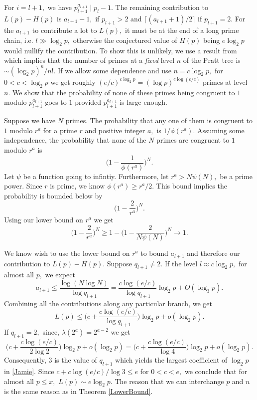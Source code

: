 \documentclass[12pt,regno]{amsart}
\begin{document}
For $i=l+1,$ we have $p_{l+1}^{a_{l+1}} \mid p_l-1.$ The remaining contribution to $L(p)-H(p)$ is $a_{l+1}-1,$ if $p_{l+1}>2$ and $\lceil (a_{l+1}+1)/2\rceil$ if $p_{l+1}=2.$ For the $a_{l+1}$ to contribute a lot to $L(p),$ it must be at the end of a long prime chain, i.e. $l \gg \log_2 p,$ otherwise the conjectured value of $H(p)$ being $e\log_2 p$ would nullify the contribution. To show this is unlikely, we use a result from \cite{BKW} which implies that the number of primes at a {\em fixed} level $n$ of the Pratt tree is $\sim (\log_2 p)^n/n!.$ If we allow some dependence and use $n=c\log_2 p,$ for $0<c<\log_2 p$ we get roughly $(e/c)^{c\log_2 p}=(\log p)^{c\log(e/c)}$ primes at level $n.$ We show that the probability of none of these primes being congruent to $1$ modulo $p_{l+1}^{a_{l+1}}$ goes to $1$ provided $p_{l+1}^{a_{l+1}}$ is large enough.

Suppose we have $N$ primes. The probability that any one of them is congruent to $1$ modulo $r^a$ for a prime $r$ and positive integer $a,$ is $1/\phi(r^a).$ Assuming some independence, the probability that none of the $N$ primes are congruent to $1$ modulo $r^a$ is 
$$\bigg(1-\frac{1}{\phi(r^a)}  \bigg)^N.$$ Let $\psi$ be a function going to infintiy. Furthermore, let $r^a > N\psi(N),$ be a prime power. Since $r$ is prime, we know $\phi(r^a)\ge r^a/2.$ This bound implies the probability is bounded below by 
$$\bigg(1-\frac{2}{r^a}  \bigg)^N.$$ Using our lower bound on $r^a$ we get
$$\bigg(1-\frac{2}{r^a}  \bigg)^N \ge 1-\bigg(1-\frac{2}{N\psi(N)}  \bigg)^N \rightarrow 1.$$ 

We know wish to use the lower bound on $r^a$ to bound $a_{l+1}$ and therefore our contribution to $L(p)-H(p).$ Suppose $q_{l+1}\ne 2.$ If the level $l \approx c\log_2 p,$ for almost all $p,$ we expect $$a_{l+1}\le \frac{\log(N\log N)}{\log q_{l+1}} = \frac{c\log(e/c)}{\log q_{l+1}}\log_2 p + O(\log_3 p).$$ Combining all the contributions along any particular branch, we get \begin{equation}\label{Jamie} L(p) \le \bigg(c+\frac{c\log(e/c)}{\log q_{l+1}}\bigg)\log_2 p + o(\log _2 p).\end{equation} If $q_{l+1}=2,$ since,  $\lambda(2^a)=2^{a-2}$ we get
$$\bigg(c+\frac{c\log(e/c)}{2\log 2 }\bigg)\log_2 p + o(\log _2 p) = \bigg(c+\frac{c\log(e/c)}{\log 4 }\bigg)\log_2 p + o(\log _2 p).$$ Consequently, 3 is the value of 
$q_{l+1}$ which yields the largest coefficient of $\log_2 p$ in \eqref{Jamie}. Since $c+c\log(e/c)/\log 3 \le e$  for $0<c<e,$ we conclude that for almost all $p\le x,$ $L(p) \sim e\log_2 p.$ The reason that we can interchange $p$ and $n$ is the same reason as in Theorem \ref{LowerBound}.
\end{document}
